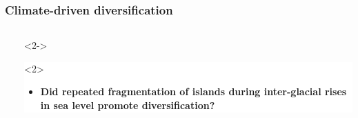 {
\begin{frame}
    \frametitle{Climate-driven diversification}    
    \begin{columns}
        \ \\


        \vspace{-2.4cm}

        \begin{uncoverenv}<2->
        \colorbox{white}{
            \begin{minipage}[t][3.6cm][t]{1.1\textwidth}

                \begin{onlyenv}<2>
                \begin{itemize}
                    \item \textbf{Did repeated fragmentation of islands
                        during inter-glacial rises in sea level promote
                        diversification?}
                \end{itemize}
                \end{onlyenv}


\end{minipage}}
\end{uncoverenv}
\end{columns}
\end{frame}}
